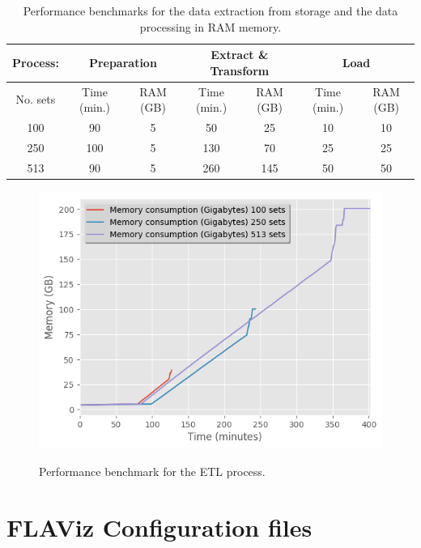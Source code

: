 \documentclass[10pt,a4paper]{article}
\begin{document}
\begin{table}
\label{Tab: Performance}
\begin{tabular}{|c||cc||cc||cc|}
\hline \hline 
Process:  & \multicolumn{2}{|c|}{Preparation} & \multicolumn{2}{|c|}{Extract \& Transform} & \multicolumn{2}{|c|}{Load}\\ 
\hline 
No. sets  & Time (min.) & RAM (GB) & Time (min.) & RAM (GB) & Time (min.) & RAM (GB)\\ 
\hline 
100 & 90 & 5 & 50 & 25 & 10 & 10\\ 
\hline 
250 & 100 & 5 & 130 & 70 & 25 & 25\\ 
\hline 
513 & 90 & 5 & 260 & 145 & 50 & 50\\ 
\hline 
\end{tabular} 
\caption{Performance benchmarks for the data extraction from storage and the data processing in RAM memory.}
\end{table}



\begin{figure}[htb!]
\centering\leavevmode
\graphicspath{{./Benchmarks/}}
%
\centering\leavevmode
\includegraphics[scale=.9]{Fig_all.png} 
\label{Fig: Performance}
\caption{\footnotesize Performance benchmark for the ETL process.}
\end{figure}

\clearpage
\section{FLAViz Configuration files}
\label{Section:configuration}
\end{document}

